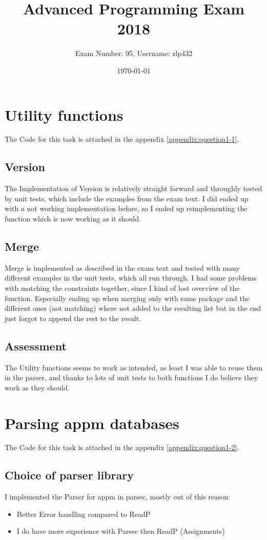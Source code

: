 \documentclass[11pt,a4paper]{article}
\begin{document}
\title{Advanced Programming Exam 2018}

\author{Exam Number: 95, Username: zlp432}
\date{\today}
	
\maketitle
\tableofcontents

\section{Utility functions}
The Code for this task is attached in the appendix \ref{appendix:question1-1}.

\subsection{Version}
The Implementation of Version is relatively straight forward and throughly tested by unit tests, which include the examples from the exam text.
I did ended up with a not working implementation before, so I ended up reimplementing the function which is now working as it should.

\subsection{Merge}
Merge is implemented as described in the exam text and tested with many different examples in the unit tests, which all run through.
I had some problems with matching the constraints together, since I kind of lost overview of the function.
Especially ending up when merging only with same package and the different ones (not matching) where not added to the resulting list but in the end just forgot to append the rest to the result.

\subsection{Assessment}
The Utility functions seems to work as intended, as least I was able to reuse them in the parser, and thanks to lots of unit tests to both functions I do believe they work as they should.

\section{Parsing appm databases}
The Code for this task is attached in the appendix \ref{appendix:question1-2}.
\subsection{Choice of parser library}
I implemented the Parser for appm in parsec, mostly out of this reason:
\begin{itemize}
	\item Better Error handling compared to ReadP
	\item I do have more experience with Parsec then ReadP (Assignments)
\end{itemize}
\end{document}
